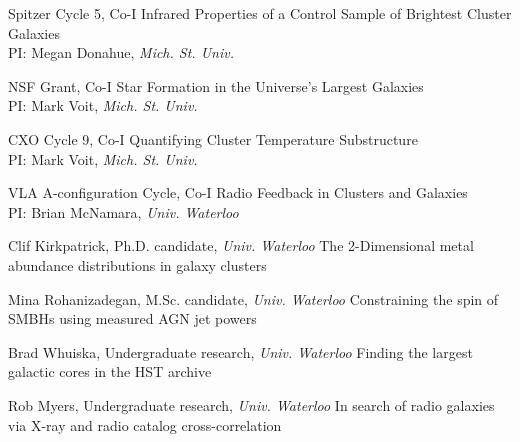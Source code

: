 \documentclass[12pt]{cv}
\begin{document}
\begin{llist}
Spitzer Cycle 5, Co-I
Infrared Properties of a Control Sample of Brightest Cluster Galaxies\\%
PI: Megan Donahue, {\textit{Mich. St. Univ.}}

NSF Grant, Co-I
Star Formation in the Universe's Largest Galaxies\\%
PI: Mark Voit, {\textit{Mich. St. Univ.}}

CXO Cycle 9, Co-I
Quantifying Cluster Temperature Substructure\\%
PI: Mark Voit, {\textit{Mich. St. Univ.}}

VLA A-configuration Cycle, Co-I
Radio Feedback in Clusters and Galaxies\\%
PI: Brian McNamara, {\textit{Univ. Waterloo}}


Clif Kirkpatrick, Ph.D. candidate, {\textit{Univ. Waterloo}}
The 2-Dimensional metal abundance distributions in galaxy clusters

Mina Rohanizadegan, M.Sc. candidate, {\textit{Univ. Waterloo}}
Constraining the spin of SMBHs using measured AGN jet powers

Brad Whuiska, Undergraduate research, {\textit{Univ. Waterloo}}
Finding the largest galactic cores in the HST archive

Rob Myers, Undergraduate research, {\textit{Univ. Waterloo}}
In search of radio galaxies via X-ray and radio catalog cross-correlation






\end{llist}
\end{document}

